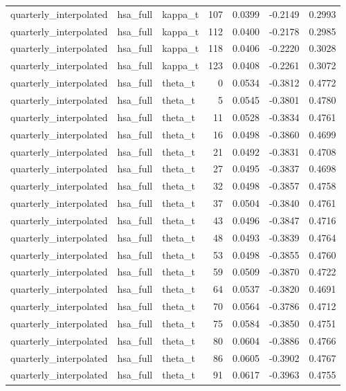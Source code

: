 \begin{tabular}{lllrrrr}
quarterly\_interpolated & hsa\_full & kappa\_t & 107 & 0.0399 & -0.2149 & 0.2993 \\
quarterly\_interpolated & hsa\_full & kappa\_t & 112 & 0.0400 & -0.2178 & 0.2985 \\
quarterly\_interpolated & hsa\_full & kappa\_t & 118 & 0.0406 & -0.2220 & 0.3028 \\
quarterly\_interpolated & hsa\_full & kappa\_t & 123 & 0.0408 & -0.2261 & 0.3072 \\
quarterly\_interpolated & hsa\_full & theta\_t & 0 & 0.0534 & -0.3812 & 0.4772 \\
quarterly\_interpolated & hsa\_full & theta\_t & 5 & 0.0545 & -0.3801 & 0.4780 \\
quarterly\_interpolated & hsa\_full & theta\_t & 11 & 0.0528 & -0.3834 & 0.4761 \\
quarterly\_interpolated & hsa\_full & theta\_t & 16 & 0.0498 & -0.3860 & 0.4699 \\
quarterly\_interpolated & hsa\_full & theta\_t & 21 & 0.0492 & -0.3831 & 0.4708 \\
quarterly\_interpolated & hsa\_full & theta\_t & 27 & 0.0495 & -0.3837 & 0.4698 \\
quarterly\_interpolated & hsa\_full & theta\_t & 32 & 0.0498 & -0.3857 & 0.4758 \\
quarterly\_interpolated & hsa\_full & theta\_t & 37 & 0.0504 & -0.3840 & 0.4761 \\
quarterly\_interpolated & hsa\_full & theta\_t & 43 & 0.0496 & -0.3847 & 0.4716 \\
quarterly\_interpolated & hsa\_full & theta\_t & 48 & 0.0493 & -0.3839 & 0.4764 \\
quarterly\_interpolated & hsa\_full & theta\_t & 53 & 0.0498 & -0.3855 & 0.4760 \\
quarterly\_interpolated & hsa\_full & theta\_t & 59 & 0.0509 & -0.3870 & 0.4722 \\
quarterly\_interpolated & hsa\_full & theta\_t & 64 & 0.0537 & -0.3820 & 0.4691 \\
quarterly\_interpolated & hsa\_full & theta\_t & 70 & 0.0564 & -0.3786 & 0.4712 \\
quarterly\_interpolated & hsa\_full & theta\_t & 75 & 0.0584 & -0.3850 & 0.4751 \\
quarterly\_interpolated & hsa\_full & theta\_t & 80 & 0.0604 & -0.3886 & 0.4766 \\
quarterly\_interpolated & hsa\_full & theta\_t & 86 & 0.0605 & -0.3902 & 0.4767 \\
quarterly\_interpolated & hsa\_full & theta\_t & 91 & 0.0617 & -0.3963 & 0.4755 \\

\end{tabular}
